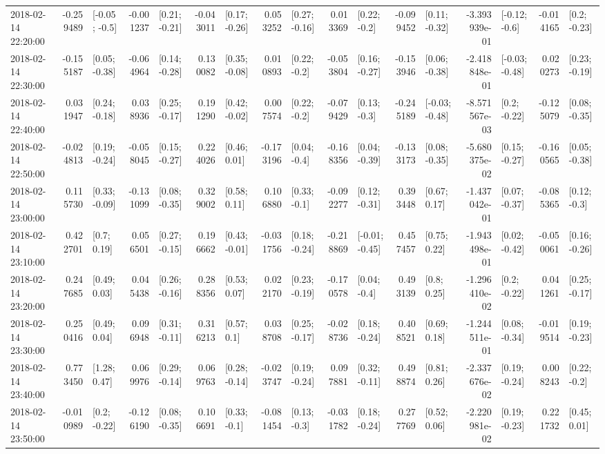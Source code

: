 \begin{tabular}{lrlrlrlrlrlrlrlrl}
2018-02-14 22:20:00 & -0.259489 &   [-0.05; -0.5] & -0.001237 &   [0.21; -0.21] & -0.043011 &   [0.17; -0.26] &  0.053252 &   [0.27; -0.16] &  0.013369 &    [0.22; -0.2] & -0.099452 &   [0.11; -0.32] & -3.393939e-01 &   [-0.12; -0.6] & -0.014165 &    [0.2; -0.23] \\
2018-02-14 22:30:00 & -0.155187 &   [0.05; -0.38] & -0.064964 &   [0.14; -0.28] &  0.130082 &   [0.35; -0.08] &  0.010893 &    [0.22; -0.2] & -0.053804 &   [0.16; -0.27] & -0.153946 &   [0.06; -0.38] & -2.418848e-01 &  [-0.03; -0.48] &  0.020273 &   [0.23; -0.19] \\
2018-02-14 22:40:00 &  0.031947 &   [0.24; -0.18] &  0.038936 &   [0.25; -0.17] &  0.191290 &   [0.42; -0.02] &  0.007574 &    [0.22; -0.2] & -0.079429 &    [0.13; -0.3] & -0.245189 &  [-0.03; -0.48] & -8.571567e-03 &    [0.2; -0.22] & -0.125079 &   [0.08; -0.35] \\
2018-02-14 22:50:00 & -0.024813 &   [0.19; -0.24] & -0.058045 &   [0.15; -0.27] &  0.224026 &    [0.46; 0.01] & -0.173196 &    [0.04; -0.4] & -0.168356 &   [0.04; -0.39] & -0.133173 &   [0.08; -0.35] & -5.680375e-02 &   [0.15; -0.27] & -0.160565 &   [0.05; -0.38] \\
2018-02-14 23:00:00 &  0.115730 &   [0.33; -0.09] & -0.131099 &   [0.08; -0.35] &  0.329002 &    [0.58; 0.11] &  0.106880 &    [0.33; -0.1] & -0.092277 &   [0.12; -0.31] &  0.393448 &    [0.67; 0.17] & -1.437042e-01 &   [0.07; -0.37] & -0.085365 &    [0.12; -0.3] \\
2018-02-14 23:10:00 &  0.422701 &     [0.7; 0.19] &  0.056501 &   [0.27; -0.15] &  0.196662 &   [0.43; -0.01] & -0.031756 &   [0.18; -0.24] & -0.218869 &  [-0.01; -0.45] &  0.457457 &    [0.75; 0.22] & -1.943498e-01 &   [0.02; -0.42] & -0.050061 &   [0.16; -0.26] \\
2018-02-14 23:20:00 &  0.247685 &    [0.49; 0.03] &  0.045438 &   [0.26; -0.16] &  0.288356 &    [0.53; 0.07] &  0.022170 &   [0.23; -0.19] & -0.170578 &    [0.04; -0.4] &  0.493139 &     [0.8; 0.25] & -1.296410e-02 &    [0.2; -0.22] &  0.041261 &   [0.25; -0.17] \\
2018-02-14 23:30:00 &  0.250416 &    [0.49; 0.04] &  0.096948 &   [0.31; -0.11] &  0.316213 &     [0.57; 0.1] &  0.038708 &   [0.25; -0.17] & -0.028736 &   [0.18; -0.24] &  0.408521 &    [0.69; 0.18] & -1.244511e-01 &   [0.08; -0.34] & -0.019514 &   [0.19; -0.23] \\
2018-02-14 23:40:00 &  0.773450 &    [1.28; 0.47] &  0.069976 &   [0.29; -0.14] &  0.069763 &   [0.28; -0.14] & -0.023747 &   [0.19; -0.24] &  0.097881 &   [0.32; -0.11] &  0.498874 &    [0.81; 0.26] & -2.337676e-02 &   [0.19; -0.24] &  0.008243 &    [0.22; -0.2] \\
2018-02-14 23:50:00 & -0.010989 &    [0.2; -0.22] & -0.126190 &   [0.08; -0.35] &  0.106691 &    [0.33; -0.1] & -0.081454 &    [0.13; -0.3] & -0.031782 &   [0.18; -0.24] &  0.277769 &    [0.52; 0.06] & -2.220981e-02 &   [0.19; -0.23] &  0.221732 &    [0.45; 0.01] \\
\bottomrule
\end{tabular}
